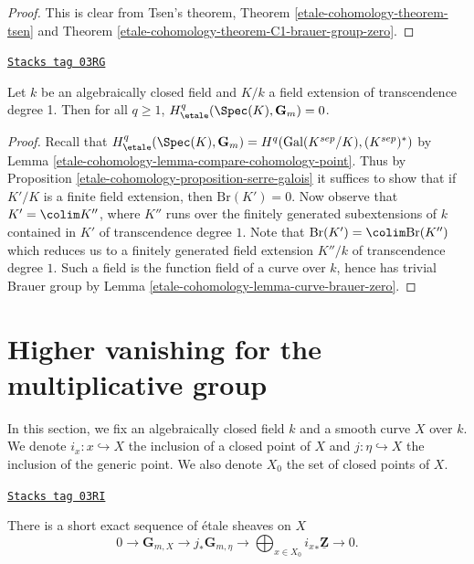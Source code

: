 \begin{proof}
This is clear from Tsen's theorem,
Theorem \ref{etale-cohomology-theorem-tsen} and
Theorem \ref{etale-cohomology-theorem-C1-brauer-group-zero}.
\end{proof}

\begin{lemma}
\label{etale-cohomology-lemma-cohomology-Gm-function-field-curve}
\href{https://stacks.math.columbia.edu/tag/03RG}{\texttt{Stacks tag 03RG}}

Let $k$ be an algebraically closed field and $K/k$ a field extension
of transcendence degree 1. Then for all $q \geq 1$,
$H_\etale^q(\Spec(K), \mathbf{G}_m) = 0$.
\end{lemma}

\begin{proof}
Recall that
$H_\etale^q(\Spec(K), \mathbf{G}_m) = H^q(\text{Gal}(K^{sep}/K), (K^{sep})^*)$
by Lemma \ref{etale-cohomology-lemma-compare-cohomology-point}.
Thus by Proposition \ref{etale-cohomology-proposition-serre-galois}
it suffices to show that if $K'/K$ is a finite field extension, then
$\text{Br}(K') = 0$. Now observe that $K' = \colim K''$, where $K''$ runs
over the finitely generated subextensions of $k$ contained in $K'$ of
transcendence degree $1$.
Note that $\text{Br}(K') = \colim \text{Br}(K'')$ which reduces us
to a finitely generated field extension $K''/k$ of transcendence
degree $1$. Such a field is the function field of a curve over $k$,
hence has trivial Brauer group by
Lemma \ref{etale-cohomology-lemma-curve-brauer-zero}.
\end{proof}

\section{Higher vanishing for the multiplicative group}
\label{etale-cohomology-section-higher-Gm}
In this section, we fix an algebraically closed field $k$ and a smooth curve
$X$ over $k$. We denote $i_x : x \hookrightarrow X$ the inclusion of a closed
point of $X$ and $j : \eta \hookrightarrow X$ the inclusion of the generic
point. We also denote $X_0$ the set of closed points of $X$.

\begin{theorem}

\label{etale-cohomology-theorem-fundamental-exact-sequence}
\href{https://stacks.math.columbia.edu/tag/03RI}{\texttt{Stacks tag 03RI}}

There is a short exact sequence of \'etale sheaves on $X$
$$
0 \longrightarrow
\mathbf{G}_{m, X} \longrightarrow
j_* \mathbf{G}_{m, \eta} \longrightarrow
\bigoplus\nolimits_{x \in X_0} {i_x}_* \underline{\mathbf{Z}}
\longrightarrow 0.
$$
\end{theorem}

